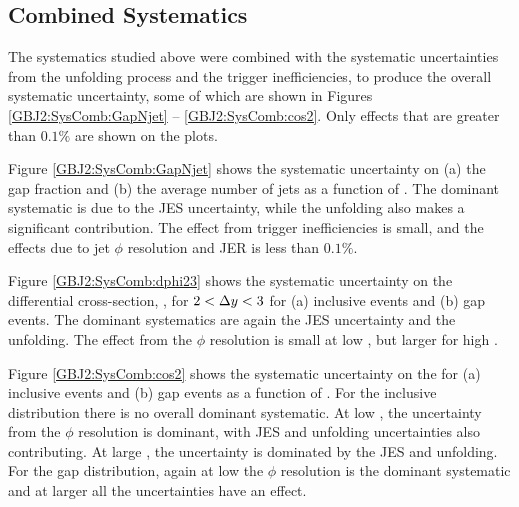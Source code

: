 \subsection{Combined Systematics}
\label{sec:GBJ2:SysComb}

The systematics studied above were combined  with the systematic uncertainties from the unfolding process and the trigger inefficiencies, to produce the overall systematic uncertainty, some of which are shown in Figures \ref{GBJ2:SysComb:GapNjet} -- \ref{GBJ2:SysComb:cos2}.
Only effects that are greater than $0.1\%$ are shown on the plots.

Figure \ref{GBJ2:SysComb:GapNjet} shows the systematic uncertainty on (a) the gap fraction and (b) the average number of jets as a function of \dy{}.
The dominant systematic is due to the JES uncertainty, while the unfolding also makes a significant contribution. 
The effect from trigger inefficiencies is small, and the effects due to jet $\phi$ resolution and JER is less than $0.1\%$.


Figure \ref{GBJ2:SysComb:dphi23} shows the systematic uncertainty on the differential cross-section, \dphiDist, for $2<\mbox{$\Delta y$}{}<3$ for (a) inclusive events and (b) gap events.
The dominant systematics are again the JES uncertainty and the unfolding. 
The effect from the $\phi$ resolution is small at low \dphi{}, but larger for high \dphi{}.

Figure \ref{GBJ2:SysComb:cos2} shows the systematic uncertainty on the \mean{\costwodphi{}} for (a) inclusive events and (b) gap events as a function of \dy{}.
For the inclusive distribution there is no overall dominant systematic. 
At low \dy{}, the uncertainty from the $\phi$ resolution is dominant, with JES and unfolding uncertainties also contributing.
At large \dy{}, the uncertainty is dominated by the JES and unfolding.
For the gap distribution, again at low \dy{} the $\phi$ resolution is the dominant systematic and at larger \dy{} all the uncertainties have an effect. 

